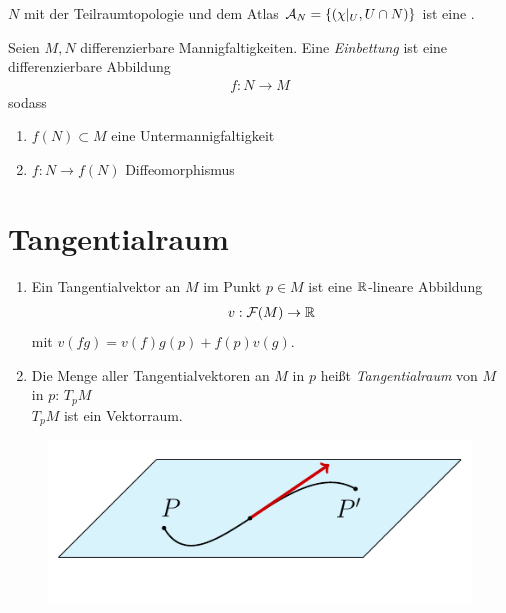\begin{bem}
$N$ mit der Teilraumtopologie und dem Atlas $\mathcal{A}_N = \left\{(\chi\vert_U, U\cap N)\right\}$ ist eine \difM.
\end{bem}

\begin{defs}
Seien $M, N$ differenzierbare Mannigfaltigkeiten. Eine \textit{Einbettung} ist eine differenzierbare Abbildung
\begin{align*}
f: N \rightarrow M
\end{align*}
sodass
\begin{enumerate}
\item$f(N)\subset M$ eine Untermannigfaltigkeit 
\item$f: N \rightarrow f(N)$ Diffeomorphismus
\end{enumerate}
\end{defs}

\section{Tangentialraum} 


\begin{defs}
\begin{enumerate}
\item Ein Tangentialvektor an $M$ im Punkt $p \in M$ ist eine $\mathbb{R}$-lineare Abbildung
\begin{align*}
v: \mathcal{F}(M) \rightarrow \mathbb{R}
\end{align*}
mit $v(fg) = v(f)g(p) + f(p)v(g)$.
\item Die Menge aller Tangentialvektoren an $M$ in $p$ heißt \textit{Tangentialraum} von $M$ in $p$: $T_pM$\\
$T_pM$ ist ein Vektorraum.
\end{enumerate}


\begin{figure}[H]
\centering
\includegraphics[scale=0.9]{figures/tikz/tangentline.pdf}
\end{figure}


\end{defs}
